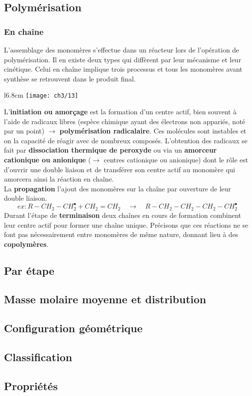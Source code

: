 	\subsection{Polymérisation}
		\subsubsection{En chaîne}
			L'assemblage des monomères s'effectue dans un réacteur lors de l'opération de polymérisation. Il en existe deux types qui diffèrent par leur mécanisme et leur cinétique. Celui en chaîne implique trois processus et tous les monomères avant synthèse se retrouvent dans le produit final. \\
			\begin{wrapfigure}[9]{l}{6.8cm}
			\vspace{-5mm}
			\texttt{[image: ch3/13]}
			\end{wrapfigure}	
			L'\textbf{initiation ou amorçage} est la formation d'un centre actif, bien souvent à l'aide de radicaux libres (espèce chimique ayant des électrons non appariés, noté par un point) $\rightarrow$ \textbf{polymérisation radicalaire}. Ces molécules sont instables et on la capacité de réagir avec de nombreux composés. L'obtention des radicaux se fait par \textbf{dissociation thermique de peroxyde} ou via un \textbf{amorceur cationique ou anionique} ($\rightarrow$ centres cationique ou anionique) dont le rôle est d'ouvrir une double liaison et de transférer son centre actif au monomère qui amorcera ainsi la réaction en chaîne.  \\
			La \textbf{propagation} l'ajout des monomères sur la chaîne par ouverture de leur double liaison. 
			\begin{equation}
				ex : R - CH_2 - CH_2^\bullet + CH_2 = CH_2 \quad \rightarrow \quad R - CH_2 - CH_2- CH_2 - CH_2^\bullet
			\end{equation}
			Durant l'étape de \textbf{terminaison} deux chaînes en cours de formation combinent leur centre actif pour former une chaîne unique. Précisons que ces réactions ne se font pas nécessairement entre monomères de même nature, donnant lieu à des \textbf{copolymères}. 
			
		\subsection{Par étape}

		
		
	\subsection{Masse molaire moyenne et distribution}
	\subsection{Configuration géométrique}
	\subsection{Classification}
	\subsection{Propriétés}
	
